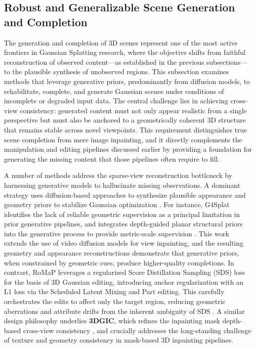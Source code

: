 \documentclass[11pt,a4paper]{article}
\begin{document}
\subsection{Robust and Generalizable Scene Generation and Completion}


The generation and completion of 3D scenes represent one of the most active frontiers in Gaussian Splatting research, where the objective shifts from faithful reconstruction of observed content---as established in the previous subsections---to the plausible synthesis of unobserved regions. This subsection examines methods that leverage generative priors, predominantly from diffusion models, to rehabilitate, complete, and generate Gaussian scenes under conditions of incomplete or degraded input data. The central challenge lies in achieving cross-view consistency: generated content must not only appear realistic from a single perspective but must also be anchored to a geometrically coherent 3D structure that remains stable across novel viewpoints. This requirement distinguishes true scene completion from mere image inpainting, and it directly complements the manipulation and editing pipelines discussed earlier by providing a foundation for generating the missing content that those pipelines often require to fill.

A number of methods address the sparse-view reconstruction bottleneck by harnessing generative models to hallucinate missing observations. A dominant strategy uses diffusion-based approaches to synthesize plausible appearance and geometry priors to stabilize Gaussian optimization \cite{arxiv:2401.09720v2}. For instance, G4Splat identifies the lack of reliable geometric supervision as a principal limitation in prior generative pipelines, and integrates depth-guided planar structural priors into the generative process to provide metric-scale supervision \cite{arxiv:2510.12099v2}. This work extends the use of video diffusion models for view inpainting, and the resulting geometry and appearance reconstructions demonstrate that generative priors, when constrained by geometric cues, produce higher-quality completions. In contrast, RoMaP leverages a regularized Score Distillation Sampling (SDS) loss for the basis of 3D Gaussian editing, introducing anchor regularization with an L1 loss via the Scheduled Latent Mixing and Part editing. This carefully orchestrates the edits to affect only the target region, reducing geometric aberrations and attribute drifts from the inherent ambiguity of SDS \cite{arxiv:2507.11061v3}. A similar design philosophy underlies \textbf{3DGIC}, which refines the inpainting mask depth-based cross-view consistency \cite{arxiv:2502.11801v2}, and crucially addresses the long-standing challenge of texture and geometry consistency in mask-based 3D inpainting pipelines.
\end{document}
